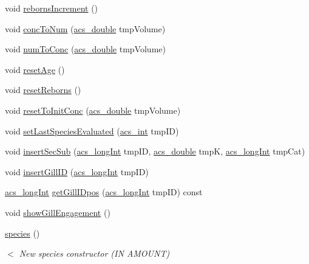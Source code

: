 \begin{DoxyCompactItemize}
\item 
void \hyperlink{a00022_a90d5fc1d90637f2245e8b0ecf228ddfa}{reborns\-Increment} ()
\item 
void \hyperlink{a00022_a9842732a5dbe0eb67e24148b5d7ae4a2}{conc\-To\-Num} (\hyperlink{a00050_ab776853a005fcbf56af0424a2a4dd607}{acs\-\_\-double} tmp\-Volume)
\item 
void \hyperlink{a00022_a23c19a53390142ba690d0f3db0520d05}{num\-To\-Conc} (\hyperlink{a00050_ab776853a005fcbf56af0424a2a4dd607}{acs\-\_\-double} tmp\-Volume)
\item 
void \hyperlink{a00022_a911d4db36e84690d19abb2902a734524}{reset\-Age} ()
\item 
void \hyperlink{a00022_a4884d8bce59ddb79e87e08f3ed16633f}{reset\-Reborns} ()
\item 
void \hyperlink{a00022_acc180a103e6681da2add266aafda3eb9}{reset\-To\-Init\-Conc} (\hyperlink{a00050_ab776853a005fcbf56af0424a2a4dd607}{acs\-\_\-double} tmp\-Volume)
\item 
void \hyperlink{a00022_a8daa007da55f042b9c436f956836f4d8}{set\-Last\-Species\-Evaluated} (\hyperlink{a00050_a8d277355641a098190360234e2ebde35}{acs\-\_\-int} tmp\-I\-D)
\item 
void \hyperlink{a00022_a0da8d53a216583f7790b12362da376a3}{insert\-Sec\-Sub} (\hyperlink{a00050_a19319d75f02db4308bc5c0026d98cd85}{acs\-\_\-long\-Int} tmp\-I\-D, \hyperlink{a00050_ab776853a005fcbf56af0424a2a4dd607}{acs\-\_\-double} tmp\-K, \hyperlink{a00050_a19319d75f02db4308bc5c0026d98cd85}{acs\-\_\-long\-Int} tmp\-Cat)
\item 
void \hyperlink{a00022_aeca516fc712a2bfa19ec560961ed03f7}{insert\-Gill\-I\-D} (\hyperlink{a00050_a19319d75f02db4308bc5c0026d98cd85}{acs\-\_\-long\-Int} tmp\-I\-D)
\item 
\hyperlink{a00050_a19319d75f02db4308bc5c0026d98cd85}{acs\-\_\-long\-Int} \hyperlink{a00022_a1a5c93a3fd5a2605d5e2fd14d29b97cd}{get\-Gill\-I\-Dpos} (\hyperlink{a00050_a19319d75f02db4308bc5c0026d98cd85}{acs\-\_\-long\-Int} tmp\-I\-D) const 
\item 
void \hyperlink{a00022_a211914e1702d47eb3203730fec2c7b4c}{show\-Gill\-Engagement} ()
\item 
\hyperlink{a00022_a25887c42dfb4b6f33a2d17fdcf74bc47}{species} ()
\begin{DoxyCompactList}\small\item\em $<$ New species constructor (I\-N A\-M\-O\-U\-N\-T) \end{DoxyCompactList}\item 

\end{DoxyCompactItemize}
